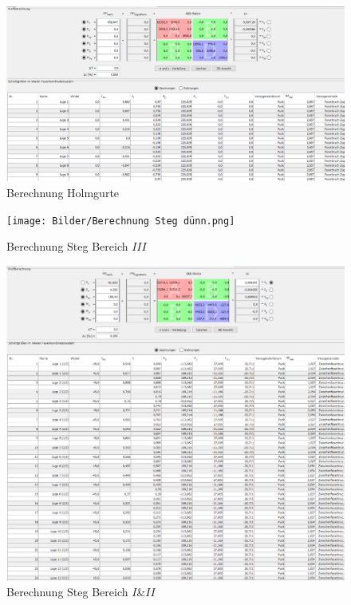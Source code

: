 \begin{figure}
	\includegraphics[width=1.0\textwidth]{Bilder/Berechnung Holmgurte.png}
	\caption{Berechnung Holmgurte}
	\label{fig:Berechnung Holmgurte}
\end{figure}
\begin{figure}
	\texttt{[image: Bilder/Berechnung Steg dünn.png]}
	\caption{Berechnung Steg Bereich $III$}
	\label{fig:Berechnung Steg dünn}
\end{figure}
\begin{figure}
	\includegraphics[width=1.0\textwidth]{Bilder/Berechnung Steg dick.png}
	\caption{Berechnung Steg Bereich $I$\&$II$}
	\label{fig:Berechung Steg dick}
\end{figure}
